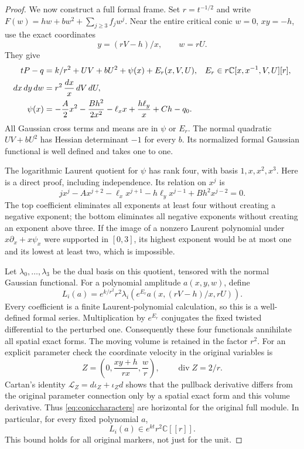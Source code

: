 \documentclass[11pt]{article}
\theoremstyle{definition}\newtheorem{definition}[theorem]{Definition}
\theoremstyle{remark}\newtheorem{remark}[theorem]{Remark}
\newcommand{\C}{\mathbb C}
\begin{document}
\begin{proof}
We now construct a full formal frame. Set $r=t^{-1/2}$ and write
$F(w)=hw+bw^2+\sum_{j\ge3}f_jw^j$. Near the entire critical
conic $w=0$, $xy=-h$, use the exact coordinates
\[
 y=(rV-h)/x,\qquad w=rU.
\]
They give
\begin{align}
 tP-q&=k/r^2+UV+bU^2+\psi(x)+E_r(x,V,U),
                  &E_r\in r\C[x,x^{-1},V,U][r],\label{eq:conicphase}\\
 dx\,dy\,dw&=r^2\,\frac{dx}{x}\,dV\,dU,\label{eq:conicvolume}\\
 \psi(x)&=-\frac A2x^2-\frac{Bh^2}{2x^2}
                -\ell_x x+\frac{h\ell_y}{x}+Ch-q_0.\notag
\end{align}
All Gaussian cross terms and means are in $\psi$ or $E_r$.
The normal quadratic $UV+bU^2$ has Hessian determinant $-1$ for
every $b$. Its normalized formal Gaussian functional is well
defined and takes one to one.

The logarithmic Laurent quotient for $\psi$ has rank four, with
basis $1,x,x^2,x^3$. Here is a direct proof, including independence.
Its relation on $x^j$ is
\[
 jx^j-Ax^{j+2}-\ell_xx^{j+1}
             -h\ell_yx^{j-1}+Bh^2x^{j-2}=0.
\]
The top coefficient eliminates all exponents at least four without
creating a negative exponent; the bottom eliminates all negative
exponents without creating an exponent above three. If the image
of a nonzero Laurent polynomial under $x\partial_x+x\psi_x$
were supported in $[0,3]$, its highest exponent would be at most
one and its lowest at least two, which is impossible.

Let $\lambda_0,\ldots,\lambda_3$ be the dual basis on this
quotient, tensored with the normal Gaussian functional. For a
polynomial amplitude $a(x,y,w)$, define
\begin{equation}\label{eq:coniccharacters}
 L_i(a)=e^{k/r^2}r^2\lambda_i\!\left(
    e^{E_r}a(x,(rV-h)/x,rU)\right).
\end{equation}
Every coefficient is a finite Laurent-polynomial calculation, so
this is a well-defined formal series. Multiplication by $e^{E_r}$
conjugates the fixed twisted differential to the perturbed one.
Consequently these four functionals annihilate all spatial exact
forms. The moving volume is retained in the factor $r^2$.
For an explicit parameter check the coordinate velocity in the
original variables is
\[
 Z=\left(0,\frac{xy+h}{rx},\frac wr\right),
                   \qquad \operatorname{div}Z=2/r.
\]
Cartan's identity $\mathcal L_Z=d\iota_Z+\iota_Zd$ shows that
the pullback derivative differs from the original parameter
connection only by a spatial exact form and this volume
derivative. Thus \eqref{eq:coniccharacters} are horizontal for
the original full module. In particular, for every fixed
polynomial $a$,
\begin{equation}\label{eq:conicseedorder}
 L_i(a)\in e^{kt}r^2\C[[r]].
\end{equation}
This bound holds for all original markers, not just for the unit.


\end{proof}
\end{document}
